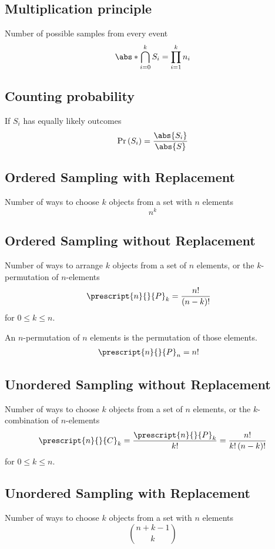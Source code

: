 \documentclass{article}
\begin{document}
\begin{multicols}{3}
    \subsection{Multiplication principle}
    Number of possible samples from every event
    \begin{equation*}
        \abs*{\bigcap_{i=0}^{k} S_i} = \prod_{i = 1}^k n_i
    \end{equation*}
    \subsection{Counting probability}
    If \(S_i\) has equally likely outcomes
    \begin{equation*}
        \Pr{\left( S_i \right)} = \frac{\abs{S_i}}{\abs{S}}
    \end{equation*}
    \subsection{Ordered Sampling with Replacement}
    Number of ways to choose \(k\) objects from a set with \(n\) elements
    \begin{equation*}
        n^k
    \end{equation*}
    \subsection{Ordered Sampling without Replacement}
    Number of ways to arrange \(k\) objects from a set of \(n\) elements,
    or the \(k\)-permutation of \(n\)-elements
    \begin{align*}
        \prescript{n}{}{P}_k & = \frac{n!}{\left( n - k \right)!}
    \end{align*}
    for \(0 \leq k \leq n\).

    An \(n\)-permutation of \(n\) elements is the permutation of those elements.
    \begin{align*}
        \prescript{n}{}{P}_n & = n!
    \end{align*}
    \subsection{Unordered Sampling without Replacement}
    Number of ways to choose \(k\) objects from a set of \(n\) elements,
    or the \(k\)-combination of \(n\)-elements
    \begin{align*}
        \prescript{n}{}{C}_k = \frac{\prescript{n}{}{P}_k}{k!} = \frac{n!}{k! \left( n - k \right)!}
    \end{align*}
    for \(0 \leq k \leq n\).
    \subsection{Unordered Sampling with Replacement}
    Number of ways to choose \(k\) objects from a set with \(n\) elements
    \begin{equation*}
        \binom{n + k - 1}{k}
    \end{equation*}
\end{multicols}
\end{document}
